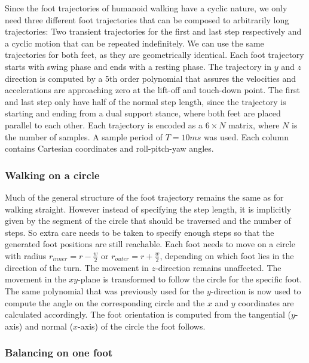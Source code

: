 \documentclass[english,ngerman]{KITreprt}
\begin{document}
Since the foot trajectories of humanoid walking have a cyclic nature, we
only need three different foot trajectories that can be composed to
arbitrarily long trajectories: Two transient trajectories for the first
and last step respectively and a cyclic motion that can be repeated
indefinitely. We can use the same trajectories for both feet, as they
are geometrically identical. Each foot trajectory starts with swing
phase and ends with a resting phase. The trajectory in $y$ and $z$
direction is computed by a 5th order polynomial that assures the
velocities and accelerations are approaching zero at the lift-off and
touch-down point. The first and last step only have half of the normal
step length, since the trajectory is starting and ending from a dual
support stance, where both feet are placed parallel to each other. Each
trajectory is encoded as a $6 \times N$ matrix, where $N$ is the number
of samples. A sample period of $T = 10ms$ was used. Each column contains
Cartesian coordinates and roll-pitch-yaw angles.

\subsubsection{Walking on a circle}\label{walking-on-a-circle}

Much of the general structure of the foot trajectory remains the same as
for walking straight. However instead of specifying the step length, it
is implicitly given by the segment of the circle that should be
traversed and the number of steps. So extra care needs to be taken to
specify enough steps so that the generated foot positions are still
reachable. Each foot needs to move on a circle with radius
$r_{inner} = r - \frac{w}{2}$ or $r_{outer} = r + \frac{w}{2}$,
depending on which foot lies in the direction of the turn. The movement
in $z$-direction remains unaffected. The movement in the $xy$-plane is
transformed to follow the circle for the specific foot. The same
polynomial that was previously used for the $y$-direction is now used to
compute the angle on the corresponding circle and the $x$ and $y$
coordinates are calculated accordingly. The foot orientation is computed
from the tangential ($y$-axis) and normal ($x$-axis) of the circle the
foot follows.

\subsubsection{Balancing on one foot}\label{balancing-on-one-foot}
\end{document}
